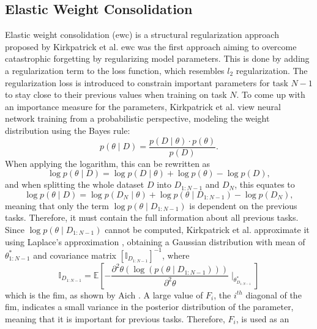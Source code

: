 \subsection{Elastic Weight Consolidation}
\label{sec:Related_work:Continual_Learning:EWC}
Elastic weight consolidation (\gls{ewc}) \cite{kirkpatrick2017overcoming} is a structural regularization approach proposed by Kirkpatrick et al.
\gls{ewc} was the first approach aiming to overcome catastrophic forgetting by regularizing model parameters. This is done by adding a regularization
term to the loss function, which resembles $l_2$ regularization. The regularization loss is introduced to constrain important parameters for
task $N-1$ to stay close to their previous values when training on task $N$. To come up with an importance measure for the parameters,
Kirkpatrick et al. view neural network training from a probabilistic perspective, modeling the weight distribution using the Bayes rule:
\begin{equation}
    p(\theta \mid D) = \frac{p(D \mid \theta) \cdot p(\theta)}{p(D)}.
\end{equation}
When applying the logarithm, this can be rewritten as
\begin{equation}
    \log p(\theta \mid D) = \log p(D \mid \theta) + \log p(\theta) - \log p(D),
\end{equation}
and when splitting the whole dataset $D$ into $D_{1:N-1}$ and $D_N$, this equates to
\begin{equation}
    \log p(\theta \mid D) = \log p(D_N \mid \theta) + \log p(\theta \mid D_{1:N-1}) - \log p(D_N),
\end{equation}
meaning that only the term $\log p(\theta \mid D_{1:N-1})$ is dependent on the previous tasks. Therefore, it must contain the full information 
about all previous tasks. Since $\log p(\theta \mid D_{1:N-1})$ cannot be computed, Kirkpatrick et al. approximate it using Laplace's approximation
\cite{mackay2003information}, obtaining a Gaussian distribution with mean of $\theta^*_{1:N-1}$ and covariance matrix $[\mathbb{I}_{D_{1:N-1}}]^{-1}$,
where
\begin{equation}
    \mathbb{I}_{D_{1:N-1}} = \mathbb{E} [- \frac{\partial^2 \theta (\log (p(\theta \mid D_{1:N-1})))}{\partial^2 \theta} \mid_{\theta^*_{D_{1:N-1}}}]
\end{equation} 
which is the \gls{fim}, as shown by Aich \cite{aich2021elastic}. A large value of $F_i$, the $i^{th}$ diagonal of the \gls{fim},
indicates a small variance in the posterior distribution of the parameter, meaning that it is important for previous tasks. Therefore, $F_i$, is used as an
